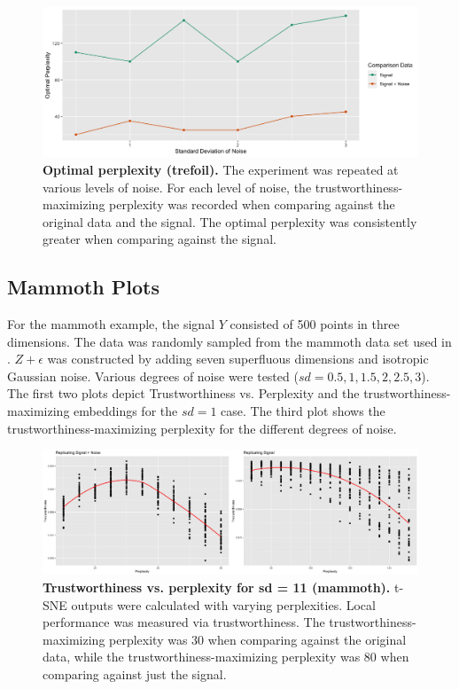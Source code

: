 \documentclass{article}
\begin{document}
\begin{figure}[H]
\centering
\includegraphics[scale=1.4]{Fig S3}
\caption{{\bf Optimal perplexity (trefoil).}
The experiment was repeated at various levels of noise. For each level of noise, the trustworthiness-maximizing perplexity was recorded when comparing against the original data and the signal. The optimal perplexity was consistently greater when comparing against the signal.}
\end{figure}

\subsection{Mammoth Plots}
For the mammoth example, the signal $Y$ consisted of 500 points in three dimensions. The data was randomly sampled from the mammoth data set used in \cite{understanding DR}. $Z + \epsilon$ was constructed by adding seven superfluous dimensions and isotropic Gaussian noise. Various degrees of noise were tested ($sd = 0.5, 1, 1.5, 2, 2.5, 3$). The first two plots depict Trustworthiness vs. Perplexity and the trustworthiness-maximizing embeddings for the $sd = 1$ case. The third plot shows the trustworthiness-maximizing perplexity for the different degrees of noise.

\begin{figure}[H]
\centering
\includegraphics[scale=0.85]{Fig S4}
\caption{{\bf Trustworthiness vs. perplexity for sd = 11 (mammoth).}
t-SNE outputs were calculated with varying perplexities. Local performance was measured via trustworthiness. The trustworthiness-maximizing perplexity was 30 when comparing against the original data, while the trustworthiness-maximizing perplexity was 80 when comparing against just the signal.}
\end{figure}
\end{document}
